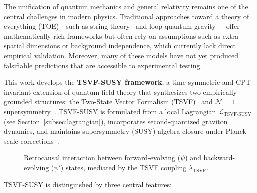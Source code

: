 \documentclass[twocolumn,superscriptaddress,floatfix]{revtex4-2}
\begin{document}
The unification of quantum mechanics and general relativity remains one of the central challenges in modern physics. Traditional approaches toward a theory of everything (TOE)—such as string theory~\cite{Polchinski1998a,Green1987} and loop quantum gravity~\cite{Rovelli2004}—offer mathematically rich frameworks but often rely on assumptions such as extra spatial dimensions or background independence, which currently lack direct empirical validation. Moreover, many of these models have not yet produced falsifiable predictions that are accessible to experimental testing.

This work develops the \textbf{TSVF-SUSY framework}, a time-symmetric and CPT-invariant extension of quantum field theory that synthesizes two empirically grounded structures: the Two-State Vector Formalism (TSVF)~\cite{Aharonov2008} and $\mathcal{N}=1$ supersymmetry~\cite{Wess1992}. TSVF-SUSY is formulated from a local Lagrangian $\mathcal{L}_{\text{TSVF-SUSY}}$ (see Section~\ref{subsec:lagrangian}), incorporates second-quantized graviton dynamics, and maintains supersymmetry (SUSY) algebra closure under Planck-scale corrections~\cite{Ferrara1974}.

\begin{figure}[htbp]
\centering
{}
\caption{Retrocausal interaction between forward-evolving (\(\psi\)) and backward-evolving (\(\psi'\)) states, mediated by the TSVF coupling \(\lambda_{\text{TSVF}}\).}
\label{fig:retrocausal}
\end{figure}

TSVF-SUSY is distinguished by three central features:
\end{document}
